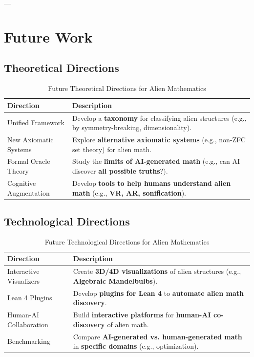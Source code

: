 \documentclass[11pt, a4paper]{article}
\begin{document}
---
\section{Future Work}
\subsection{Theoretical Directions}
\begin{table}[h]
\centering
\caption{Future Theoretical Directions for Alien Mathematics}
\label{tab:future_theory}
\begin{tabular}{|>{\raggedright\arraybackslash}p{4cm}|>{\raggedright\arraybackslash}p{6cm}|}
\hline
\textbf{Direction} & \textbf{Description} \\
\hline
Unified Framework & Develop a \textbf{taxonomy} for classifying alien structures (e.g., by symmetry-breaking, dimensionality). \\
\hline
New Axiomatic Systems & Explore \textbf{alternative axiomatic systems} (e.g., non-ZFC set theory) for alien math. \\
\hline
Formal Oracle Theory & Study the \textbf{limits of AI-generated math} (e.g., can AI discover \textbf{all possible truths}?). \\
\hline
Cognitive Augmentation & Develop \textbf{tools to help humans understand alien math} (e.g., \textbf{VR, AR, sonification}). \\
\hline
\end{tabular}
\end{table}

\subsection{Technological Directions}
\begin{table}[h]
\centering
\caption{Future Technological Directions for Alien Mathematics}
\label{tab:future_tech}
\begin{tabular}{|>{\raggedright\arraybackslash}p{4cm}|>{\raggedright\arraybackslash}p{6cm}|}
\hline
\textbf{Direction} & \textbf{Description} \\
\hline
Interactive Visualizers & Create \textbf{3D/4D visualizations} of alien structures (e.g., \textbf{Algebraic Mandelbulbs}). \\
\hline
Lean 4 Plugins & Develop \textbf{plugins for Lean 4} to \textbf{automate alien math discovery}. \\
\hline
Human-AI Collaboration & Build \textbf{interactive platforms} for \textbf{human-AI co-discovery} of alien math. \\
\hline
Benchmarking & Compare \textbf{AI-generated vs. human-generated math} in \textbf{specific domains} (e.g., optimization). \\
\hline
\end{tabular}
\end{table}
\end{document}
